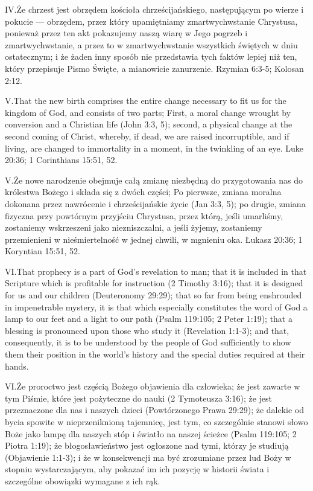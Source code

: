 \lettrine{IV.} Że chrzest jest obrzędem kościoła chrześcijańskiego, następującym po wierze i pokucie — obrzędem, przez który upamiętniamy zmartwychwstanie Chrystusa, ponieważ przez ten akt pokazujemy naszą wiarę w Jego pogrzeb i zmartwychwstanie, a przez to w zmartwychwstanie wszystkich świętych w dniu ostatecznym; i że żaden inny sposób nie przedstawia tych faktów lepiej niż ten, który przepisuje Pismo Święte, a mianowicie zanurzenie. Rzymian 6:3-5; Kolosan 2:12.


\lettrine{V.} That the new birth comprises the entire change necessary to fit us for the kingdom of God, and consists of two parts; First, a moral change wrought by conversion and a Christian life (John 3:3, 5); second, a physical change at the second coming of Christ, whereby, if dead, we are raised incorruptible, and if living, are changed to immortality in a moment, in the twinkling of an eye. Luke 20:36; 1 Corinthians 15:51, 52.


\lettrine{V.} Że nowe narodzenie obejmuje całą zmianę niezbędną do przygotowania nas do królestwa Bożego i składa się z dwóch części; Po pierwsze, zmiana moralna dokonana przez nawrócenie i chrześcijańskie życie (Jan 3:3, 5); po drugie, zmiana fizyczna przy powtórnym przyjściu Chrystusa, przez którą, jeśli umarliśmy, zostaniemy wskrzeszeni jako niezniszczalni, a jeśli żyjemy, zostaniemy przemienieni w nieśmiertelność w jednej chwili, w mgnieniu oka. Łukasz 20:36; 1 Koryntian 15:51, 52.


\lettrine{VI.} That prophecy is a part of God’s revelation to man; that it is included in that Scripture which is profitable for instruction (2 Timothy 3:16); that it is designed for us and our children (Deuteronomy 29:29); that so far from being enshrouded in impenetrable mystery, it is that which especially constitutes the word of God a lamp to our feet and a light to our path (Psalm 119:105; 2 Peter 1:19); that a blessing is pronounced upon those who study it (Revelation 1:1-3); and that, consequently, it is to be understood by the people of God sufficiently to show them their position in the world’s history and the special duties required at their hands.


\lettrine{VI.} Że proroctwo jest częścią Bożego objawienia dla człowieka; że jest zawarte w tym Piśmie, które jest pożyteczne do nauki (2 Tymoteusza 3:16); że jest przeznaczone dla nas i naszych dzieci (Powtórzonego Prawa 29:29); że dalekie od bycia spowite w nieprzeniknioną tajemnicę, jest tym, co szczególnie stanowi słowo Boże jako lampę dla naszych stóp i światło na naszej ścieżce (Psalm 119:105; 2 Piotra 1:19); że błogosławieństwo jest ogłoszone nad tymi, którzy je studiują (Objawienie 1:1-3); i że w konsekwencji ma być zrozumiane przez lud Boży w stopniu wystarczającym, aby pokazać im ich pozycję w historii świata i szczególne obowiązki wymagane z ich rąk.


